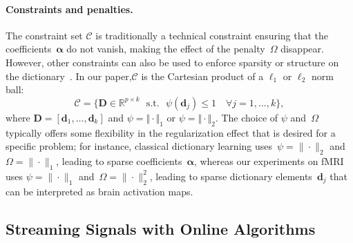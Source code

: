\documentclass{article}
\def\RR{{\mathbb{R}}}
\def\D{{\mathbf D}}
\def\d{{\mathbf d}}
\newcommand{\balpha}{\boldsymbol{\alpha}}
\begin{document}
\paragraph{Constraints and penalties.} The constraint set $\mathcal{C}$ is traditionally
a technical constraint ensuring that the coefficients~$\balpha$ do not vanish,
making the effect of the penalty~$\Omega$ disappear. However, other constraints can also be
used to enforce sparsity or structure on the dictionary~\citep[see][]{varoquaux_cohort-level_2013}. In our paper,$\mathcal{C}$ is the Cartesian product of a $\ell_1$ or $\ell_2$ norm ball:
\begin{equation}
\mathcal{C} = \{ \D \in \RR^{p \times k}~~~\text{s.t.}~~~ \psi(\d_j) \leq 1
\quad \forall j =1,\ldots,k\},
\label{eq:ball}
\end{equation}
where $\D=[\d_1,\ldots,\d_k]$ and
 $\psi = \Vert \cdot \Vert_1$ or $\psi = \Vert \cdot
\Vert_2$.
The choice of $\psi$ and~$\Omega$ typically offers
some flexibility in the regularization effect that is desired for a specific problem;
for instance, classical dictionary learning uses~$\psi=\| \cdot \|_2$ and~$\Omega=\|\cdot\|_1$,
leading to sparse coefficients~$\balpha$, whereas our experiments on fMRI
uses $\psi=\|\cdot\|_1$ and~$\Omega=\|\cdot\|_2^2$, leading to sparse dictionary
elements~$\d_j$ that can be interpreted as brain activation maps.


\subsection{Streaming Signals with Online Algorithms}
\end{document}
